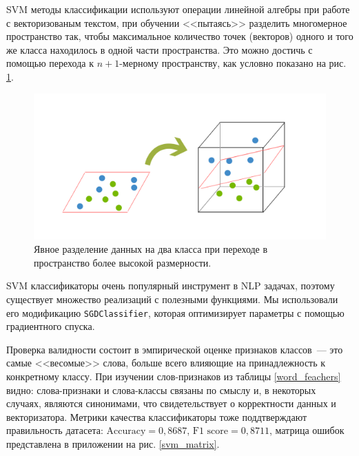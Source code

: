 \documentclass[a4paper, 14pt]{extarticle}
\begin{document}
SVM методы классификации используют операции линейной алгебры при работе с векторизованым текстом, при обучении <<пытаясь>> разделить многомерное пространство так, чтобы максимальное количество точек  (векторов) одного и того же класса находилось в одной части пространства. Это можно достичь с помощью перехода к $n+1$-мерному пространству, как условно показано на рис. \ref{svm_cond}.

\begin{figure}
	\centering
	\includegraphics[scale=0.6]{svm_cond}
	\caption{Явное разделение данных на два класса при переходе в пространство более высокой размерности.}
	\label{svm_cond}
\end{figure}

SVM классификаторы очень популярный инструмент в NLP задачах, поэтому существует множество реализаций с полезными функциями. Мы использовали его модификацию \verb+SGDClassifier+, которая оптимизирует параметры с помощью градиентного спуска.

Проверка валидности состоит в эмпирической оценке признаков классов~--- это самые <<весомые>> слова, больше всего влияющие на принадлежность к конкретному классу. При изучении слов-признаков из таблицы \ref{word_feachers} видно: слова-признаки и слова-классы связаны по смыслу и, в некоторых случаях, являются синонимами, что свидетельствует о корректности данных и векторизатора. Метрики качества классификаторы тоже поддтверждают правильность датасета: $\text{Accuracy} = 0,8687$, $\text{F1 score} = 0,8711$, матрица ошибок представлена в приложении на рис. \ref{svm_matrix}.
\end{document}
